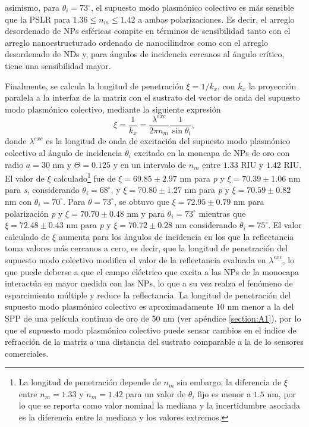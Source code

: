  asimismo, para $\theta_i=73^\circ$, el supuesto modo  plasmónico colectivo es más sensible que la PSLR para $1.36\leq n_m \leq 1.42$  a ambas polarizaciones. %
Es decir, el arreglo desordenado de NPs esféricas compite en términos de sensibilidad tanto con el arreglo nanoestructurado ordenado de nanocilindros como con el arreglo desordenado de NDs y, para ángulos de incidencia cercanos al ángulo crítico, tiene una sensibilidad mayor. 

Finalmente, se calcula la longitud de penetración $\xi=1/k_x$, con $k_x$ la proyección paralela a la interfaz de la matriz con el sustrato del vector de onda del supuesto modo plasmónico colectivo, mediante la siguiente expresión
%
\begin{equation}
\xi=\frac{1}{k_x}= \frac{\lambda^{exc}}{2\pi n_m}\frac{1}{\sin\theta_i},
\label{eq:penetracion}
\end{equation}
%
donde $\lambda^{exc}$ es la longitud de onda de excitación del supuesto modo plasmónico colectivo al ángulo de incidencia $\theta_i$ excitado en la moncapa de NPs de oro con radio $a=30$ nm y $\Theta=0.125$  y en un intervalo de $n_m$ entre $1.33$ RIU y $1.42$ RIU. El valor de $\xi$ calculado\footnote{La longitud de penetración depende de $n_m$ sin embargo, la diferencia de $\xi$ entre $n_m=1.33$ y $n_m=1.42$ para un valor de $\theta_i$ fijo es menor a $1.5$ nm, por lo que se reporta como valor nominal la mediana y la incertidumbre asociada es la diferencia entre la mediana y los valores extremos.} fue de $\xi= 69.85\pm 2.97$ nm para \emph{p} y $\xi=70.39\pm 1.06$ nm para \emph{s}, considerando $\theta_i=68^\circ$, y $\xi=70.80\pm 1.27$ nm para \emph{p} y $\xi=70.59\pm0.82$ nm con  $\theta_i=70^\circ$. Para $\theta=73^\circ$, se obtuvo que $\xi=72.95\pm 0.79$ nm para polarización \emph{p} y $\xi=70.70\pm 0.48$ nm y para $\theta_i=73^\circ$ mientras que $\xi=72.48\pm0.43$ nm para \emph{p} y $\xi=70.72\pm 0.28$ nm considerando $\theta_i=75^\circ$. El valor calculado de $\xi$ aumenta para los ángulos de incidencia en los que la reflectancia toma valores más cercanos a cero,  es decir, que la longitud de penetración del supuesto modo colectivo modifica el valor de la reflectancia evaluada en $\lambda^{exc}$, lo que puede deberse a que el campo eléctrico que excita a las NPs de la monocapa interactúa en mayor medida con las NPs, lo que a su vez realza el fenómeno de esparcimiento múltiple y reduce la reflectancia. La longitud de penetración del supuesto modo plasmónico colectivo es aproximadamente $10$ nm  menor a la del SPP de una película continua de oro de $50$ nm (ver apéndice \ref{section:A1}), por lo que el supuesto modo plasmónico colectivo puede sensar cambios en el índice de refracción de la matriz a una distancia del sustrato comparable a la de lo sensores comerciales.